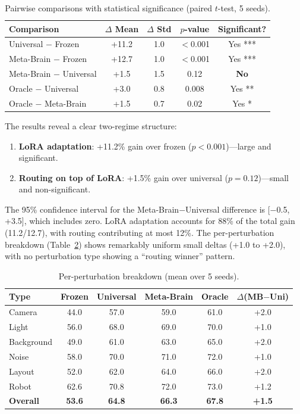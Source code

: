 \documentclass[letterpaper]{article}
\newcommand{\ours}{Meta-Brain}
\begin{document}
\begin{table}[h]
\centering
\caption{Pairwise comparisons with statistical significance (paired $t$-test, 5 seeds).}
\label{tab:significance}
\begin{tabular}{lcccc}
\toprule
Comparison & $\Delta$ Mean & $\Delta$ Std & $p$-value & Significant? \\
\midrule
Universal $-$ Frozen & +11.2 & 1.0 & $<$0.001 & Yes *** \\
\ours{} $-$ Frozen & +12.7 & 1.0 & $<$0.001 & Yes *** \\
\ours{} $-$ Universal & +1.5 & 1.5 & 0.12 & \textbf{No} \\
Oracle $-$ Universal & +3.0 & 0.8 & 0.008 & Yes ** \\
Oracle $-$ \ours{} & +1.5 & 0.7 & 0.02 & Yes * \\
\bottomrule
\end{tabular}
\end{table}

The results reveal a clear two-regime structure:
\begin{enumerate}
    \item \textbf{LoRA adaptation}: +11.2\% gain over frozen ($p < 0.001$)---large and significant.
    \item \textbf{Routing on top of LoRA}: +1.5\% gain over universal ($p = 0.12$)---small and non-significant.
\end{enumerate}

The 95\% confidence interval for the \ours{}$-$Universal difference is [$-$0.5, +3.5], which includes zero.
LoRA adaptation accounts for 88\% of the total gain (11.2/12.7), with routing contributing at most 12\%.
The per-perturbation breakdown (Table~\ref{tab:per_type_full}) shows remarkably uniform small deltas (+1.0 to +2.0), with no perturbation type showing a ``routing winner'' pattern.

\begin{table}[h]
\centering
\caption{Per-perturbation breakdown (mean over 5 seeds).}
\label{tab:per_type_full}
\begin{tabular}{lccccc}
\toprule
Type & Frozen & Universal & \ours{} & Oracle & $\Delta$(MB$-$Uni) \\
\midrule
Camera & 44.0 & 57.0 & 59.0 & 61.0 & +2.0 \\
Light & 56.0 & 68.0 & 69.0 & 70.0 & +1.0 \\
Background & 49.0 & 61.0 & 63.0 & 65.0 & +2.0 \\
Noise & 58.0 & 70.0 & 71.0 & 72.0 & +1.0 \\
Layout & 52.0 & 62.0 & 64.0 & 66.0 & +2.0 \\
Robot & 62.6 & 70.8 & 72.0 & 73.0 & +1.2 \\
\midrule
\textbf{Overall} & \textbf{53.6} & \textbf{64.8} & \textbf{66.3} & \textbf{67.8} & \textbf{+1.5} \\
\bottomrule
\end{tabular}
\end{table}
\end{document}
